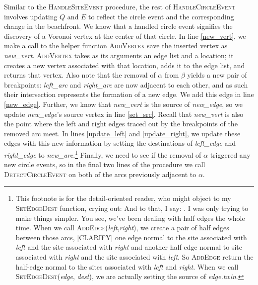 \documentclass[12pt,twoside]{reedthesis}
\begin{document}
    Similar to the \textsc{HandleSiteEvent} procedure, the rest of \textsc{HandleCircleEvent} involves updating $Q$ and $E$ to reflect the circle event and the corresponding change in the beachfront. We know that a handled circle event signifies the discovery of a Voronoi vertex at the center of that circle. In line \ref{new_vert}, we make a call to the helper function \textsc{AddVertex} save the inserted vertex as \textit{new\_vert}. \textsc{AddVertex} takes as its arguments an edge list and a location; it creates a new vertex associated with that location, adds it to the edge list, and returns that vertex. Also note that the removal of $\alpha$ from $\beta$ yields a new pair of breakpoints: \textit{left\_arc} and \textit{right\_arc} are now adjacent to each other, and as such their intersection represents the formation of a new edge. We add this edge in line \ref{new_edge}. Further, we know that \textit{new\_vert} is the source of \textit{new\_edge}, so we update \textit{new\_edge}'s source vertex in line \ref{set_src}. Recall that \textit{new\_vert} is also the point where the left and right edges traced out by the breakpoints of the removed arc meet. In lines \ref{update_left} and \ref{update_right}, we update these edges with this new information by setting the destinations of \textit{left\_edge} and \textit{right\_edge} to \textit{new\_arc}.\footnote{This footnote is for the detail-oriented reader, who might object to my \textsc{SetEdgeDest} function, crying out:  And to that, I say: . I was only trying to make things simpler. You see, we've been dealing with half edges the whole time. When we call \textsc{AddEdge}(\textit{left},\textit{right}), we create a pair of half edges between those arcs, [CLARIFY] one edge normal to the site associated with \textit{left} and the site associated with \textit{right} and another half edge normal to site associated with \textit{right} and the site associated with \textit{left}. So \textsc{AddEdge} return the half-edge normal to the sites associated with \textit{left} and \textit{right}. When we call \textsc{SetEdgeDest}(\textit{edge}, \textit{dest}), we are actually setting the source of \textit{edge.twin}.} Finally, we need to see if the removal of $\alpha$ triggered any new circle events, so in the final two lines of the procedure we call \textsc{DetectCircleEvent} on both of the arcs previously adjacent to $\alpha$.\par
\end{document}
